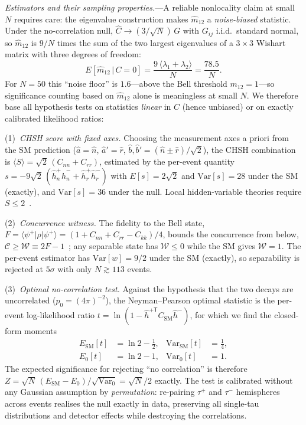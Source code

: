 \documentclass[prl,twocolumn,superscriptaddress,floatfix]{revtex4-2}
\newcommand{\mtwo}{m_{12}}
\newcommand{\hhat}{\hat{h}}
\begin{document}
\textit{Estimators and their sampling properties.}---A reliable
nonlocality claim at small $N$ requires care: the eigenvalue
construction makes $\hat\mtwo$ a \emph{noise-biased} statistic.  Under
the no-correlation null, $\hat C\to(3/\sqrt N)\,G$ with $G_{ij}$
i.i.d.\ standard normal, so $\hat\mtwo$ is $9/N$ times the sum of the
two largest eigenvalues of a $3\times3$ Wishart matrix with three
degrees of freedom:
\begin{equation}
  E[\hat\mtwo \,|\, C=0] = \frac{9\,\langle\lambda_1+\lambda_2\rangle}{N}
  = \frac{78.5}{N}.
  \label{eq:m12bias}
\end{equation}
For $N=50$ this ``noise floor'' is $1.6$---above the Bell threshold
$\mtwo=1$---so significance counting based on $\hat\mtwo$ alone is
meaningless at small $N$.  We therefore base all hypothesis tests on
statistics \emph{linear} in $C$ (hence unbiased) or on exactly
calibrated likelihood ratios:

(1)~\emph{CHSH score with fixed axes.}  Choosing the measurement axes
a priori from the SM prediction
($\hat a=\hat n$, $\hat a'=\hat r$,
$\hat b,\hat b'=(\hat n\pm\hat r)/\sqrt2$),
the CHSH combination is
$\langle S\rangle = \sqrt{2}\,(C_{nn}+C_{rr})$, estimated by the
per-event quantity
$s = -9\sqrt{2}\,(\hhat^+_n \hhat^-_n + \hhat^+_r \hhat^-_r)$ with
$E[s]=2\sqrt2$ and $\mathrm{Var}[s]=28$ under the SM (exactly), and
$\mathrm{Var}[s]=36$ under the null.  Local hidden-variable theories
require $S\le2$~\cite{CHSH1969}.

(2)~\emph{Concurrence witness.}  The fidelity to the Bell state,
$F=\langle\psi^+|\rho|\psi^+\rangle = (1+C_{nn}+C_{rr}-C_{kk})/4$,
bounds the concurrence from below,
$\mathcal{C}\ge \mathcal{W}\equiv 2F-1$~\cite{Bennett1996}; any
separable state has $\mathcal{W}\le0$ while the SM gives
$\mathcal{W}=1$.  The per-event estimator has
$\mathrm{Var}[w]=9/2$ under the SM (exactly), so separability is
rejected at $5\sigma$ with only $N\gtrsim113$ events.

(3)~\emph{Optimal no-correlation test.}  Against the hypothesis that
the two decays are uncorrelated ($p_0=(4\pi)^{-2}$), the
Neyman--Pearson optimal statistic is the per-event log-likelihood
ratio $t=\ln(1-\hhat^{+\mathsf{T}}C_{\mathrm{SM}}\hhat^-)$, for which
we find the closed-form moments
\begin{align}
  E_{\mathrm{SM}}[t] &= \ln 2 - \tfrac12, &
  \mathrm{Var}_{\mathrm{SM}}[t] &= \tfrac14, \nonumber\\
  E_{0}[t] &= \ln 2 - 1, &
  \mathrm{Var}_{0}[t] &= 1 .
  \label{eq:llr}
\end{align}
The expected significance for rejecting ``no correlation'' is
therefore $Z=\sqrt{N}\,(E_{\mathrm{SM}}-E_0)/\sqrt{\mathrm{Var}_0}
=\sqrt{N}/2$ exactly.  The test is calibrated without any Gaussian
assumption by \emph{permutation}: re-pairing $\tau^+$ and $\tau^-$
hemispheres across events realises the null exactly in data,
preserving all single-tau distributions and detector effects while
destroying the correlations.
\end{document}
